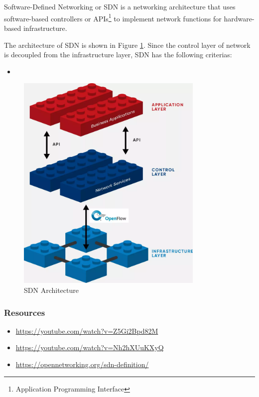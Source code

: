\documentclass[en]{university}
\begin{document}
\setupdocument

\section{}
Software-Defined Networking or SDN is a networking architecture that uses software-based controllers or APIs\footnote{Application Programming Interface} to implement network functions for hardware-based infrastructure. 

The architecture of SDN is shown in Figure \ref{fig:sdn}. Since the control layer of network is decoupled from the infrastructure layer, SDN has the following criterias:
\begin{itemize}
    \item 
\end{itemize}

\begin{figure}
    \centering
    \includegraphics[width=0.8\textwidth]{resources/sdn-architecture-img.png}
    \caption{SDN Architecture}
    \label{fig:sdn}
\end{figure}


\subsubsection*{Resources}
\begin{itemize}
    \item \href{https://youtube.com/watch?v=Z5Gi2Bpd82M}{\url{https://youtube.com/watch?v=Z5Gi2Bpd82M}}
    \item \href{https://youtube.com/watch?v=Nh2hXUuKXyQ}{\url{https://youtube.com/watch?v=Nh2hXUuKXyQ}}
    \item \href{https://opennetworking.org/sdn-definition/}{\url{https://opennetworking.org/sdn-definition/}}
\end{itemize}
\end{document}
